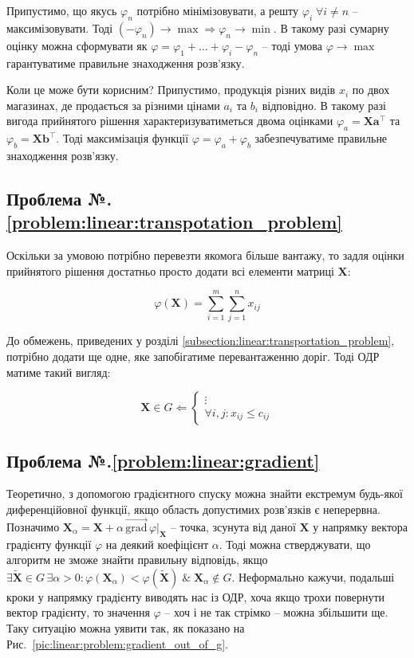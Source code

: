 \documentclass[\main/book.tex]{subfiles}
\begin{document}
Припустимо, що якусь $\varphi_n$ потрібно мінімізовувати, а решту $\varphi_i \; \forall {i \neq n}$ -- максимізовувати. Тоді $(-\varphi_n) \rightarrow \max \Rightarrow \varphi_n \rightarrow \min$. В такому разі сумарну оцінку можна сформувати як $\varphi = \varphi_1 + \ldots + \varphi_i - \varphi_n$ -- тоді умова $\varphi \rightarrow \max$ гарантуватиме правильне знаходження розв'язку.

Коли це може бути корисним? Припустимо, продукція різних видів $x_i$ по двох магазинах, де продається за різними цінами $a_i$ та $b_i$ відповідно. В такому разі \flqq{}вигода\frqq{} прийнятого рішення характеризуватиметься двома оцінками $\varphi_a = \mathbf{X} \mathbf{a}^\top$ та $\varphi_b = \mathbf{X} \mathbf{b}^\top$. Тоді максимізація функції $\varphi = \varphi_a + \varphi_b$ забезпечуватиме правильне знаходження розв'язку.

\subsection*{Проблема №.\ref{problem:linear:transpotation_problem}}

Оскільки за умовою потрібно \flqq{}перевезти якомога більше вантажу\frqq{}, то задля оцінки прийнятого рішення достатньо просто додати всі елементи матриці $\mathbf{X}$:

\[
 \varphi(\mathbf{X}) = \sum_{i=1}^{m} \sum_{j=1}^{n} x_{ij}
\]

До обмежень, приведених у розділі \ref{subsection:linear:transportation_problem}, потрібно додати ще одне, яке запобігатиме перевантаженню доріг. Тоді ОДР матиме такий вигляд:

\[
 \mathbf{X} \in G \Leftarrow \left\{
  \begin{array}{l}
   \vdots \\
   \forall i, j: x_{ij} \leq c_{ij}
  \end{array}
 \right.
\]

\subsection*{Проблема №.\ref{problem:linear:gradient}}

Теоретично, з допомогою градієнтного спуску можна знайти екстремум будь-якої диференційовної функції, якщо область допустимих розв'язків є неперервна. Позначимо $\mathbf{X}_\alpha = \mathbf{X} + \alpha \, \overrightarrow{\textrm{grad}} \, \varphi \Bigr|_\mathbf{X}$ -- точка, зсунута від даної $\mathbf{X}$ у напрямку вектора градієнту функції $\varphi$ на деякий коефіцієнт $\alpha$. Тоді можна стверджувати, що алгоритм не зможе знайти правильну відповідь, якщо $\exists \widetilde{\mathbf{X}} \in G \, \exists \alpha > 0: \varphi(\mathbf{X}_\alpha) < \varphi(\widetilde{\mathbf{X}}) \;\&\; \mathbf{X}_\alpha \notin G$. Неформально кажучи, подальші кроки у напрямку градієнту виводять нас із ОДР, хоча якщо трохи повернути вектор градієнту, то значення $\varphi$ -- хоч і не так стрімко -- можна збільшити ще. Таку ситуацію можна уявити так, як показано на Рис.~\ref{pic:linear:problem:gradient_out_of_g}.
\end{document}

